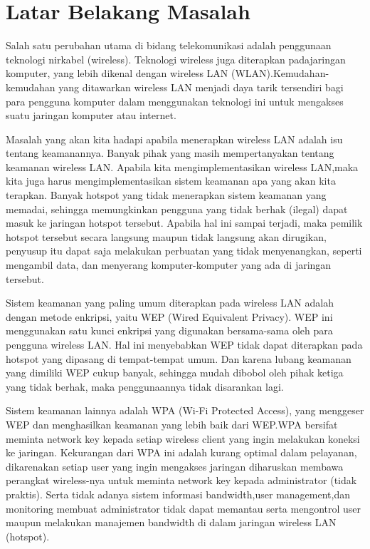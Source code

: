 \documentclass{jtetiproposalskripsi}
\begin{document}
\section{Latar Belakang Masalah}
Salah satu perubahan utama di bidang telekomunikasi adalah penggunaan teknologi nirkabel (wireless). Teknologi wireless juga diterapkan padajaringan komputer, yang lebih dikenal dengan wireless LAN (WLAN).Kemudahan-kemudahan yang ditawarkan wireless LAN menjadi daya tarik tersendiri bagi para pengguna komputer dalam menggunakan teknologi ini untuk mengakses suatu jaringan komputer atau internet.


Masalah yang akan kita hadapi apabila menerapkan wireless LAN adalah isu tentang keamanannya. Banyak pihak yang masih mempertanyakan tentang keamanan wireless LAN. Apabila kita mengimplementasikan wireless LAN,maka kita juga harus mengimplementasikan sistem keamanan apa yang akan kita terapkan. Banyak hotspot yang tidak menerapkan sistem keamanan yang
memadai, sehingga memungkinkan pengguna yang tidak berhak (ilegal) dapat masuk ke jaringan hotspot tersebut. Apabila hal ini sampai terjadi, maka pemilik hotspot tersebut secara langsung maupun tidak langsung akan dirugikan, penyusup itu dapat saja melakukan perbuatan yang tidak menyenangkan, seperti mengambil data, dan menyerang komputer-komputer yang ada di jaringan tersebut.


Sistem keamanan yang paling umum diterapkan pada wireless LAN adalah dengan metode enkripsi, yaitu WEP (Wired Equivalent Privacy). WEP ini menggunakan satu kunci enkripsi yang digunakan bersama-sama oleh para pengguna wireless LAN. Hal ini menyebabkan WEP tidak dapat diterapkan pada hotspot yang dipasang di tempat-tempat umum. Dan karena lubang keamanan yang dimiliki WEP cukup banyak, sehingga mudah dibobol oleh pihak ketiga yang tidak berhak, maka penggunaannya tidak disarankan lagi.

Sistem keamanan lainnya adalah WPA (Wi-Fi Protected Access), yang menggeser WEP dan menghasilkan keamanan yang lebih baik dari WEP.WPA bersifat meminta network key kepada setiap wireless client yang ingin melakukan koneksi ke jaringan. Kekurangan dari WPA ini adalah kurang optimal dalam pelayanan, dikarenakan setiap user yang ingin mengakses jaringan diharuskan membawa perangkat wireless-nya untuk meminta network key kepada administrator (tidak praktis). Serta tidak adanya sistem informasi bandwidth,user management,dan monitoring membuat administrator tidak dapat memantau serta mengontrol user maupun melakukan manajemen bandwidth di dalam jaringan wireless LAN (hotspot).
\end{document}
